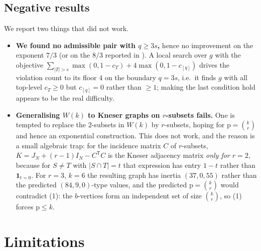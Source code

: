 \documentclass[11pt,a4paper]{article}
\theoremstyle{plain}
\theoremstyle{definition}
\newcommand{\pp}{\mathrm{p}}
\begin{document}
\subsection{Negative results}

We report two things that did not work.
\begin{itemize}
\item \textbf{We found no admissible pair with $q\ge3s$,} hence no improvement on the
      exponent $7/3$ (or on the $8/3$ reported in \cite{ElphickEtAl2026Inertia}).
      A local search over $g$ with the objective
      $\sum_{|T|>s}\max(0,1-c_T)+4\max(0,1-c_{[q]})$ drives the violation count to its
      floor $4$ on the boundary $q=3s$, i.e.\ it finds $g$ with all top-level $c_T\ge0$
      but $c_{[q]}=0$ rather than $\ge1$; making the last condition hold appears to be the
      real difficulty.
\item \textbf{Generalising $W(k)$ to Kneser graphs on $r$-subsets fails.}  One is tempted to
      replace the $2$-subsets in $W(k)$ by $r$-subsets, hoping for $\pp=\binom{k}{r}$
      and hence an exponential construction.  This does not work, and the reason is a
      small algebraic trap: for the incidence matrix $C$ of $r$-subsets,
      $K=J_N+(r-1)I_N-C^{\mathsf T}C$ is the Kneser adjacency matrix \emph{only for
      $r=2$}, because for $S\ne T$ with $|S\cap T|=t$ that expression has entry $1-t$
      rather than $\mathbf 1_{t=0}$.  For $r=3$, $k=6$ the resulting graph has inertia
      $(37,0,55)$ rather than the predicted $(84,9,0)$-type values, and the predicted
      $\pp=\binom kr$ would contradict (1): the $b$-vertices form an independent set of
      size $\binom kr$, so (1) forces $\pp\le k$.
\end{itemize}

\section{Limitations}
\end{document}
